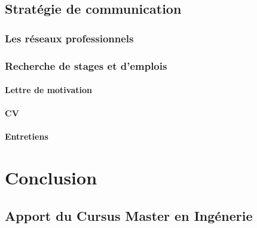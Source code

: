 \documentclass[a4paper,12pt, draft]{report}
\begin{document}
\chapter{Stratégie de communication}
\section{Les réseaux professionnels}
\section{Recherche de stages et d'emplois}
\subsection{Lettre de motivation}
\subsection{CV}
\subsection{Entretiens}

\part{Conclusion}
\chapter{Apport du Cursus Master en Ingénerie}
\end{document}

